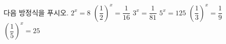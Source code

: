 다음 방정식을 푸시오.
 $2^x=8$
 $\left(\dfrac{1}{2}\right)^{x}=\dfrac{1}{16}$
 $3^x=\dfrac{1}{81}$
 $5^x=125$
 $\left(\dfrac{1}{3}\right)^{x}=\dfrac{1}{9}$
 $\left(\dfrac{1}{5}\right)^{x}=25$
